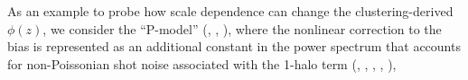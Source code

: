 As an example to probe how scale dependence can change the clustering-derived $\phi(z)$, we consider  the ``P-model'' (\citealt{Smith++07}, \citealt{Hamann++08}, \citealt{CresswellPercival09}), where the nonlinear correction to the bias is represented as an additional constant in the power spectrum that accounts for non-Poissonian shot noise associated with the 1-halo term (\citealt{PeacockSmith00}, \citealt{Seljak00}, \citealt{SchulzWhite06}, \citealt{Guzik++07}, \citealt{WechslerTinker18}),

